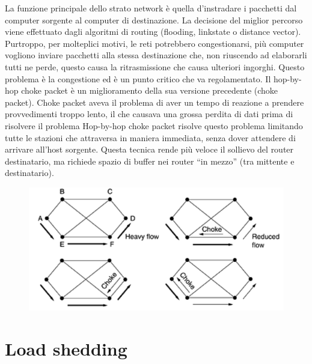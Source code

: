 La funzione principale dello strato network è quella d’instradare i pacchetti dal computer sorgente al computer di destinazione. La decisione del miglior percorso viene effettuato dagli algoritmi di routing (flooding, linkstate o distance vector). Purtroppo, per molteplici motivi, le reti potrebbero congestionarsi, più computer vogliono inviare pacchetti alla stessa destinazione che, non riuscendo ad elaborarli tutti ne perde, questo causa la ritrasmissione che causa ulteriori ingorghi. Questo problema è la congestione ed è un punto critico che va regolamentato.
Il hop-by-hop choke packet è un miglioramento della sua versione precedente (choke packet).
Choke packet aveva il problema di aver un tempo di reazione a prendere provvedimenti troppo lento, il che causava una grossa perdita di dati prima di risolvere il problema
Hop-by-hop choke packet risolve questo problema limitando tutte le stazioni che attraversa in maniera immediata, senza dover attendere di arrivare all’host sorgente.
Questa tecnica rende più veloce il sollievo del router destinatario, ma richiede spazio di buffer nei router “in mezzo” (tra mittente e destinatario).

\begin{figure}[H]
\centering
\includegraphics[scale=0.6]{res/img/36_ChokePacketHopbHop.png}
\end{figure}
 
\section{Load shedding}

